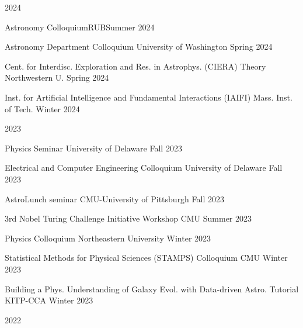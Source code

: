\documentclass[11pt,letterpaper]{article}
\begin{document}
\nopagebreak\begin{list}{}{\malzlist}
	\item 2024
	\nopagebreak\begin{list}{}{\malzlist}
		\item \talk{}
		{Astronomy Colloquium}{RUB}{Summer 2024}
		\item {}
		{Astronomy Department Colloquium}
		{University of Washington}
		{Spring 2024}
		\item {}
		{Cent. for Interdisc. Exploration and Res. in Astrophys. (CIERA) Theory}
		{Northwestern U.}
		{Spring 2024}
		\item {}
		{Inst. for Artificial Intelligence and Fundamental Interactions (IAIFI)}
		{Mass. Inst. of Tech.}
		{Winter 2024}
	\end{list}
	\item 2023
	\nopagebreak\begin{list}{}{\malzlist}
		\item {}
		{Physics Seminar}
		{University of Delaware}
		{Fall 2023}
		\item {}
		{Electrical and Computer Engineering Colloquium}
		{University of Delaware}
		{Fall 2023}
		\item {}
		{AstroLunch seminar}
		{CMU-University of Pittsburgh}
		{Fall 2023}
		\item {}
		{3rd Nobel Turing Challenge Initiative Workshop}
		{CMU}
		{Summer 2023}
		\item {}
		{Physics Colloquium}
		{Northeastern University}
		{Winter 2023}
		\item {}
		{Statistical Methods for Physical Sciences (STAMPS) Colloquium}
		{CMU}
		{Winter 2023}
		\item {}
		{Building a Phys. Understanding of Galaxy Evol. with Data-driven Astro. Tutorial}
		{KITP-CCA}
		{Winter 2023}
	\end{list}
	\item 2022
	\nopagebreak\begin{list}{}{\malzlist}
		\item {}

\end{list}
\end{list}
\end{document}
